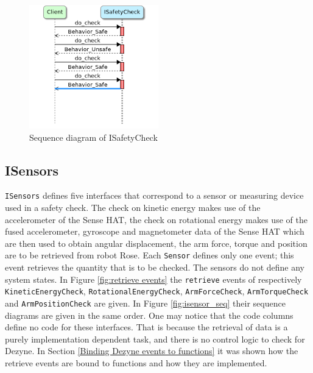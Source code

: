 \documentclass[12pt]{scrreprt}
\begin{document}
\begin{appendices}
\begin{figure}[H]
    \centering
    \includegraphics[width=0.5\textwidth]{Figures/results/modelling_figures/ISafetyCheck/ISafetyCheck_seq.png}
    \caption{Sequence diagram of ISafetyCheck}
    \label{fig:Sequence diagram of ISafetyCheck.}
\end{figure}

\subsection{ISensors}
\texttt{ISensors} defines five interfaces that correspond to a sensor or measuring device used in a safety check. The check on kinetic energy makes use of the accelerometer of the Sense HAT, the check on rotational energy makes use of the fused accelerometer, gyroscope and magnetometer data of the Sense HAT which are then used to obtain angular displacement, the arm force, torque and position are to be retrieved from robot Rose. Each \texttt{Sensor} defines only one event; this event retrieves the quantity that is to be checked. The sensors do not define any system states. In Figure \ref{fig:retrieve events} the \texttt{retrieve} events of respectively \texttt{KineticEnergyCheck}, \texttt{RotationalEnergyCheck}, \texttt{ArmForceCheck}, \texttt{ArmTorqueCheck} and \texttt{ArmPositionCheck} are given. In Figure \ref{fig:isensor_seq} their sequence diagrams are given in the same order. One may notice that the code columns define no code for these interfaces. That is because the retrieval of data is a purely implementation dependent task, and there is no control logic to check for Dezyne. In Section \ref{Binding Dezyne events to functions} it was shown how the retrieve events are bound to functions and how they are implemented.


\end{appendices}
\end{document}
